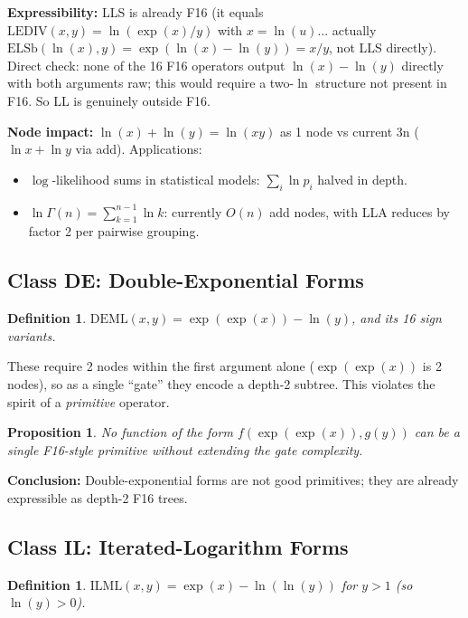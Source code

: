 \documentclass[11pt]{article}
\newtheorem{proposition}[theorem]{Proposition}
\newtheorem{definition}[theorem]{Definition}
\begin{document}
\noindent \textbf{Expressibility:} LLS is already F16 (it equals
$\mathrm{LEDIV}(x,y) = \ln(\exp(x)/y)$ with $x = \ln(u)$... actually
$\mathrm{ELSb}(\ln(x), y) = \exp(\ln(x) - \ln(y)) = x/y$, not LLS directly).
Direct check: none of the 16 F16 operators output $\ln(x) - \ln(y)$ directly
with both arguments raw; this would require a two-$\ln$ structure not present in F16.
So LL is genuinely outside F16.

\noindent \textbf{Node impact:}
$\ln(x) + \ln(y) = \ln(xy)$ as 1 node vs current 3n ($\ln x + \ln y$ via add).
Applications:
\begin{itemize}
  \item $\log$-likelihood sums in statistical models: $\sum_i \ln p_i$ halved in depth.
  \item $\ln\Gamma(n) = \sum_{k=1}^{n-1} \ln k$: currently $O(n)$ add nodes, with LLA
        reduces by factor 2 per pairwise grouping.
\end{itemize}

\subsection{Class DE: Double-Exponential Forms}

\begin{definition}
$\mathrm{DEML}(x,y) = \exp(\exp(x)) - \ln(y)$, and its 16 sign variants.
\end{definition}

\noindent These require 2 nodes within the first argument alone ($\exp(\exp(x))$ is
2 nodes), so as a single ``gate'' they encode a depth-2 subtree.
This violates the spirit of a \emph{primitive} operator.

\begin{proposition}
No function of the form $f(\exp(\exp(x)), g(y))$ can be a single F16-style
primitive without extending the gate complexity.
\end{proposition}

\noindent \textbf{Conclusion:} Double-exponential forms are not good primitives;
they are already expressible as depth-2 F16 trees.

\subsection{Class IL: Iterated-Logarithm Forms}

\begin{definition}
$\mathrm{ILML}(x,y) = \exp(x) - \ln(\ln(y))$ for $y > 1$ (so $\ln(y) > 0$).
\end{definition}
\end{document}
